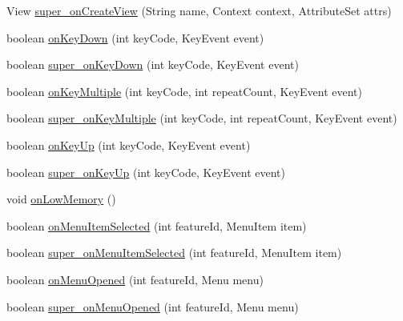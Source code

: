 \begin{DoxyCompactItemize}
\item 
View \hyperlink{classorg_1_1qtproject_1_1qt5_1_1android_1_1bindings_1_1_qt_activity_a4e054eb047b9531cc8abaa75039136f2}{super\+\_\+on\+Create\+View} (String name, Context context, Attribute\+Set attrs)
\item 
boolean \hyperlink{classorg_1_1qtproject_1_1qt5_1_1android_1_1bindings_1_1_qt_activity_ac1ee5a8d6b1ed5e7757139be8d7810be}{on\+Key\+Down} (int key\+Code, Key\+Event event)
\item 
boolean \hyperlink{classorg_1_1qtproject_1_1qt5_1_1android_1_1bindings_1_1_qt_activity_af7fbc3d78f28c7599fac81499717ac8d}{super\+\_\+on\+Key\+Down} (int key\+Code, Key\+Event event)
\item 
boolean \hyperlink{classorg_1_1qtproject_1_1qt5_1_1android_1_1bindings_1_1_qt_activity_a9b41df58aada132667b9af5a8aa01aa7}{on\+Key\+Multiple} (int key\+Code, int repeat\+Count, Key\+Event event)
\item 
boolean \hyperlink{classorg_1_1qtproject_1_1qt5_1_1android_1_1bindings_1_1_qt_activity_a108ba4840f9990f299beb44cced0a45d}{super\+\_\+on\+Key\+Multiple} (int key\+Code, int repeat\+Count, Key\+Event event)
\item 
boolean \hyperlink{classorg_1_1qtproject_1_1qt5_1_1android_1_1bindings_1_1_qt_activity_ac81bcf0a973ed2f8035bc3af8ee73f78}{on\+Key\+Up} (int key\+Code, Key\+Event event)
\item 
boolean \hyperlink{classorg_1_1qtproject_1_1qt5_1_1android_1_1bindings_1_1_qt_activity_a0e236df83e1edd02ba8587199fc47e05}{super\+\_\+on\+Key\+Up} (int key\+Code, Key\+Event event)
\item 
void \hyperlink{classorg_1_1qtproject_1_1qt5_1_1android_1_1bindings_1_1_qt_activity_a60dde1c5c76102c0514119fbc9515450}{on\+Low\+Memory} ()
\item 
boolean \hyperlink{classorg_1_1qtproject_1_1qt5_1_1android_1_1bindings_1_1_qt_activity_a15f3f492aba46975a36f1ebdfbe5ba45}{on\+Menu\+Item\+Selected} (int feature\+Id, Menu\+Item item)
\item 
boolean \hyperlink{classorg_1_1qtproject_1_1qt5_1_1android_1_1bindings_1_1_qt_activity_a054b8b51a53012f32a3d30bf395c18ca}{super\+\_\+on\+Menu\+Item\+Selected} (int feature\+Id, Menu\+Item item)
\item 
boolean \hyperlink{classorg_1_1qtproject_1_1qt5_1_1android_1_1bindings_1_1_qt_activity_afa718d6a5777a519b1d513d7cbda938a}{on\+Menu\+Opened} (int feature\+Id, Menu menu)
\item 
boolean \hyperlink{classorg_1_1qtproject_1_1qt5_1_1android_1_1bindings_1_1_qt_activity_ab1719c7260a5641289249620984077bd}{super\+\_\+on\+Menu\+Opened} (int feature\+Id, Menu menu)

\end{DoxyCompactItemize}
